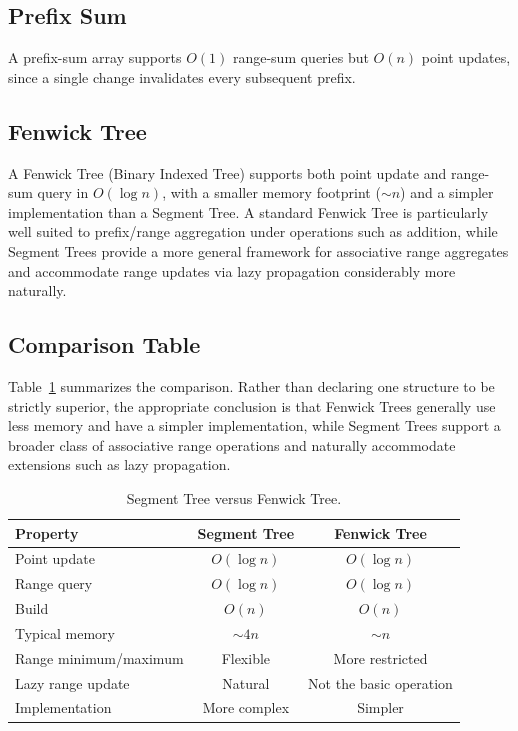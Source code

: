 \documentclass[11pt]{article}
\begin{document}
\subsection{Prefix Sum}
A prefix-sum array supports $O(1)$ range-sum queries but $O(n)$ point updates, since a single change invalidates every subsequent prefix.

\subsection{Fenwick Tree}
A Fenwick Tree (Binary Indexed Tree) supports both point update and range-sum query in $O(\log n)$, with a smaller memory footprint ($\sim n$) and a simpler implementation than a Segment Tree. A standard Fenwick Tree is particularly well suited to prefix/range aggregation under operations such as addition, while Segment Trees provide a more general framework for associative range aggregates and accommodate range updates via lazy propagation considerably more naturally.

\subsection{Comparison Table}
Table~\ref{tab:comparison} summarizes the comparison. Rather than declaring one structure to be strictly superior, the appropriate conclusion is that Fenwick Trees generally use less memory and have a simpler implementation, while Segment Trees support a broader class of associative range operations and naturally accommodate extensions such as lazy propagation.

\begin{table}[h]
\centering
\caption{Segment Tree versus Fenwick Tree.}
\label{tab:comparison}
\begin{tabular}{lcc}
\toprule
\textbf{Property} & \textbf{Segment Tree} & \textbf{Fenwick Tree} \\
\midrule
Point update            & $O(\log n)$ & $O(\log n)$ \\
Range query              & $O(\log n)$ & $O(\log n)$ \\
Build                    & $O(n)$      & $O(n)$ \\
Typical memory           & $\sim 4n$   & $\sim n$ \\
Range minimum/maximum    & Flexible    & More restricted \\
Lazy range update        & Natural     & Not the basic operation \\
Implementation           & More complex& Simpler \\
\bottomrule
\end{tabular}
\end{table}
\end{document}
